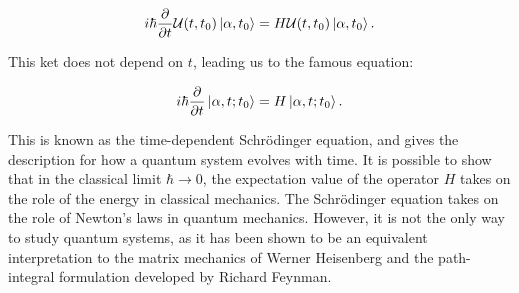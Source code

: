 \begin{equation}
 i \hbar \frac{\partial}{\partial t} \mathcal{U}(t, t_0)
    \ket{\alpha, t_0} = H \mathcal{U}(t, t_0) \ket{\alpha, t_0} .
\end{equation}

This ket does not depend on $t$, leading us to the famous equation:

\begin{equation}
 i \hbar \frac{\partial}{\partial t}
    \ket{\alpha, t; t_0} = H \ket{\alpha, t; t_0} .
\end{equation}

This is known as the time-dependent Schr\"{o}dinger equation,
and gives the description for how a quantum system evolves with time.
It is possible to show that in the classical limit
$\hbar \rightarrow 0$,
the expectation value of the operator $H$ takes on the
role of the energy in classical mechanics.
The Schr\"{o}dinger equation takes on the role
of Newton's laws in quantum mechanics. However, it is not the only
way to study quantum systems, as it has been shown to be an equivalent
interpretation to the matrix mechanics of Werner Heisenberg
and the path-integral formulation developed by Richard Feynman.
